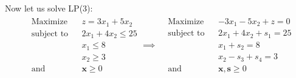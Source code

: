 \documentclass{article}
\renewcommand\vec{\mathbf}
\begin{document}
Now let us solve LP(3):
\begin{align*}
  \begin{aligned}
    &{\text{Maximize}}
    &&z=3x_1+5x_2\\
    &{\text{subject to}}
    &&2x_1+4x_2\le25\\
    &
    &&x_1\le8\\
    &
    &&x_2\ge3\\
    &{\text{and}}
    &&\vec x\ge 0
  \end{aligned}\implies
  \begin{aligned}
  &{\text{Maximize}}
  &&-3x_1-5x_2+z=0\\
  &{\text{subject to}}
  &&2x_1+4x_2+s_1=25\\
  &
  &&x_1+s_2=8\\
  &
  &&x_2-s_3+s_4=3\\
  &{\text{and}}
  &&\vec x,\vec s\ge 0
\end{aligned}
\end{align*}
\end{document}
